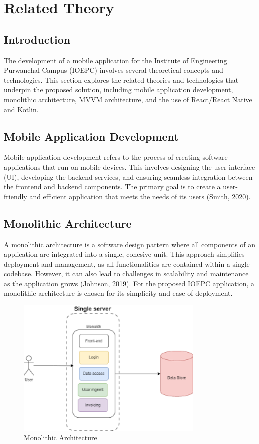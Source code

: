 \chapter{Related Theory}

\section{Introduction}
The development of a mobile application for the Institute of Engineering Purwanchal Campus (IOEPC) involves several theoretical concepts and technologies. This section explores the related theories and technologies that underpin the proposed solution, including mobile application development, monolithic architecture, MVVM architecture, and the use of React/React Native and Kotlin.

\section{Mobile Application Development}
Mobile application development refers to the process of creating software applications that run on mobile devices. This involves designing the user interface (UI), developing the backend services, and ensuring seamless integration between the frontend and backend components. The primary goal is to create a user-friendly and efficient application that meets the needs of its users (Smith, 2020).

\section{Monolithic Architecture}
A monolithic architecture is a software design pattern where all components of an application are integrated into a single, cohesive unit. This approach simplifies deployment and management, as all functionalities are contained within a single codebase. However, it can also lead to challenges in scalability and maintenance as the application grows (Johnson, 2019). For the proposed IOEPC application, a monolithic architecture is chosen for its simplicity and ease of deployment.

\begin{figure}[H]
    \centering
    \includegraphics[width=0.8\textwidth]{Graphics/monolithic_architecture.png}
    \caption{Monolithic Architecture}
    \label{fig:monolithic_architecture}
\end{figure}

